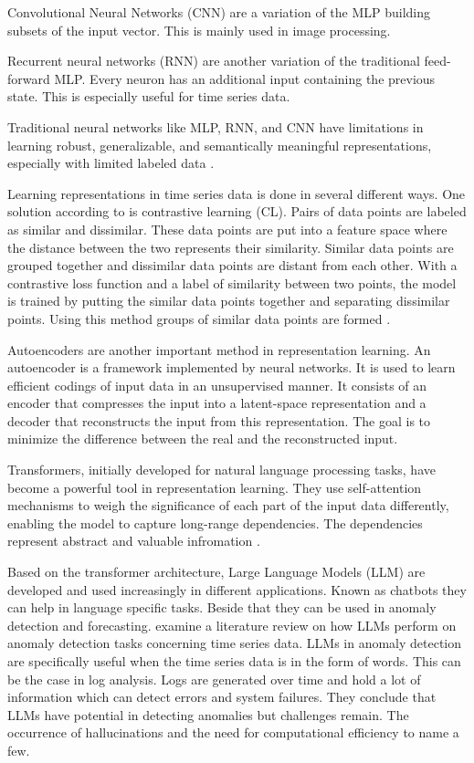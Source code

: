 Convolutional Neural Networks (CNN) are a variation of the MLP building subsets of the input vector. This is mainly used in image processing.

Recurrent neural networks (RNN) are another variation of the traditional feed-forward MLP. Every neuron has an additional input containing the previous state. This is especially useful for time series data.

Traditional neural networks like MLP, RNN, and CNN have limitations in learning robust, generalizable, and semantically meaningful representations, especially with limited labeled data \cite{shi_trade-off_2023}.

Learning representations in time series data is done in several different ways. One solution according to \cite{zhang_debiased_2024} is contrastive learning (CL).  Pairs of data points are labeled as similar and dissimilar. These data points are put into a feature space where the distance between the two represents their similarity. Similar data points are grouped together and dissimilar data points are distant from each other. With a contrastive loss function and a label of similarity between two points, the model is trained by putting the similar data points together and separating dissimilar points. Using this method groups of similar data points are formed \cite{shi_trade-off_2023}.

Autoencoders are another important method in representation learning. An autoencoder is a framework implemented by neural networks. It is used to learn efficient codings of input data in an unsupervised manner. It consists of an encoder that compresses the input into a latent-space representation and a decoder that reconstructs the input from this representation. The goal is to minimize the difference between the real and the reconstructed input.

Transformers, initially developed for natural language processing tasks, have become a powerful tool in representation learning. They use self-attention mechanisms to weigh the significance of each part of the input data differently, enabling the model to capture long-range dependencies. The dependencies represent abstract and valuable infromation \cite{vaswani_attention_2017}.

Based on the transformer architecture, Large Language Models (LLM) are developed and used increasingly in different applications. Known as chatbots they can help in language specific tasks. Beside that they can be used in anomaly detection and forecasting. \cite{su_large_2024} examine a literature review on how LLMs perform on anomaly detection tasks concerning time series data. LLMs in anomaly detection are specifically useful when the time series data is in the form of words. This can be the case in log analysis. Logs are generated over time and hold a lot of information which can detect errors and system failures. They conclude that LLMs have potential in detecting anomalies but challenges remain. The occurrence of hallucinations and the need for computational efficiency to name a few.

